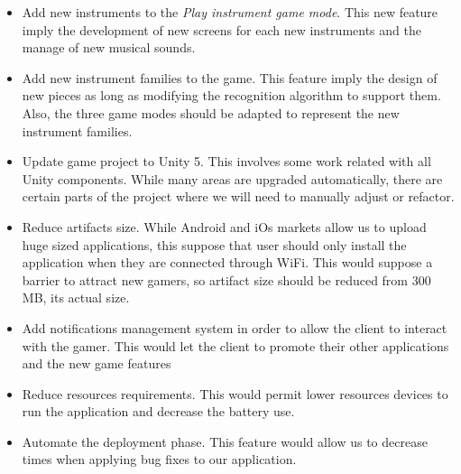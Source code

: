 \begin{itemize}
\item Add new instruments to the \textit{Play instrument game mode}. This new feature imply the development of new screens for each new instruments and the manage of new musical sounds.
\item Add new instrument families to the game. This feature imply the design of new pieces as long as modifying the recognition algorithm to support them. Also, the three game modes should be adapted to represent the new instrument families.
\item Update game project to Unity 5. This involves some work related with all Unity components. While many areas are upgraded automatically, there are certain parts of the project where we will need to manually adjust or refactor.
\item Reduce artifacts size. While Android and iOs markets allow us to upload huge sized applications, this suppose that user should only install the application when they are connected through WiFi. This would suppose a barrier to attract new gamers, so artifact size should be reduced from 300 MB, its actual size.
\item Add notifications management system in order to allow the client to interact with the gamer. This would let the client to promote their other applications and the new game features
\item Reduce resources requirements. This would permit lower resources devices to run the application and decrease the battery use.
\item Automate the deployment phase. This feature would allow us to decrease times when applying bug fixes to our application.
\end{itemize}